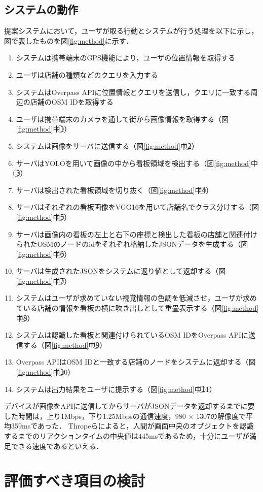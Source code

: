 \subsection{システムの動作}
提案システムにおいて，ユーザが取る行動とシステムが行う処理を以下に示し，図で表したものを図\ref{fig:method}に示す．
\begin{enumerate}
    \item システムは携帯端末のGPS機能により，ユーザの位置情報を取得する
    \item ユーザは店舗の種類などのクエリを入力する
    \item システムはOverpass APIに位置情報とクエリを送信し，クエリに一致する周辺の店舗のOSM IDを取得する
    \item ユーザは携帯端末のカメラを通して街から画像情報を取得する（図\ref{fig:method}中\textcircled{\scriptsize 1}）
    \item システムは画像をサーバに送信する（図\ref{fig:method}中\textcircled{\scriptsize 2}）
    \item サーバはYOLOを用いて画像の中から看板領域を検出する（図\ref{fig:method}中\textcircled{\scriptsize 3}）
    \item サーバは検出された看板領域を切り抜く（図\ref{fig:method}中\textcircled{\scriptsize 4}）
    \item サーバはそれぞれの看板画像をVGG16を用いて店舗名でクラス分けする（図\ref{fig:method}中\textcircled{\scriptsize 5}）
    \item サーバは画像内の看板の左上と右下の座標と検出した看板の店舗と関連付けられたOSMのノードのidをそれぞれ格納したJSONデータを生成する（図\ref{fig:method}中\textcircled{\scriptsize 6}）
    \item サーバは生成されたJSONをシステムに返り値として返却する（図\ref{fig:method}中\textcircled{\scriptsize 7}）
    \item システムはユーザが求めていない視覚情報の色調を低減させ，ユーザが求めている店舗の情報を看板の横に吹き出しとして重畳表示する（図\ref{fig:method}中\textcircled{\scriptsize 8}）
    \item システムは認識した看板と関連付けられているOSM IDをOverpass APIに送信する（図\ref{fig:method}中\textcircled{\scriptsize 9}）
    \item Overpass APIはOSM IDと一致する店舗のノードをシステムに返却する（図\ref{fig:method}中\textcircled{\scriptsize 10}）
    \item システムは出力結果をユーザに提示する（図\ref{fig:method}中\textcircled{\scriptsize 11}）
\end{enumerate}

デバイスが画像をAPIに送信してからサーバがJSONデータを返却するまでに要した時間は，上り1Mbps，下り1.25Mbpsの通信速度，980 $\times$ 1307の解像度で平均359msであった．
Thropeらによると，人間が画面中央のオブジェクトを認識するまでのリアクションタイムの中央値は445msであるため\cite{Thorpe:1996}，十分にユーザが満足できる速度であるといえる．



\section{評価すべき項目の検討}